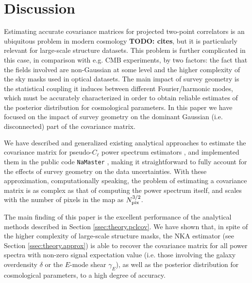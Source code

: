 \documentclass[a4paper,11pt]{article}
\newcommand{\todo}[1]{{\bf TODO: #1}}
\begin{document}
  \section{Discussion}\label{sec:discussion}
    Estimating accurate covariance matrices for projected two-point correlators is an ubiquitous problem in modern cosmology \todo{cites}, but it is particularly relevant for large-scale structure datasets. This problem is further complicated in this case, in comparison with e.g. CMB experiments, by two factors: the fact that the fields involved are non-Gaussian at some level and the higher complexity of the sky masks used in optical datasets. The main impact of survey geometry is the statistical coupling it induces between different Fourier/harmonic modes, which must be accurately characterized in order to obtain reliable estimates of the posterior distribution for cosmological parameters. In this paper we have focused on the impact of survey geometry on the dominant Gaussian (i.e. disconnected) part of the covariance matrix.
    
    We have described and generalized existing analytical approaches to estimate the covariance matrix for pseudo-$C_\ell$ power spectrum estimators \cite{2004MNRAS.349..603E,2005MNRAS.360.1262B,2017A&A...602A..41C}, and implemented them in the public code {\tt NaMaster} \cite{2019MNRAS.484.4127A}, making it straightforward to fully account for the effects of survey geometry on the data uncertainties. With these approximation, computationally speaking, the problem of estimating a covariance matrix is as complex as that of computing the power spectrum itself, and scales with the number of pixels in the map as $N_{\rm pix}^{3/2}$.
    
    The main finding of this paper is the excellent performance of the analytical methods described in Section \ref{ssec:theory.pclcov}. We have shown that, in spite of the higher complexity of large-scale structure masks, the NKA estimator (see Section \ref{ssec:theory.approx}) is able to recover the covariance matrix for all power spectra with non-zero signal expectation value (i.e. those involving the galaxy overdensity $\delta$ or the $E$-mode shear $\gamma_E$), as well as the posterior distribution for cosmological parameters, to a high degree of accuracy.
\end{document}
